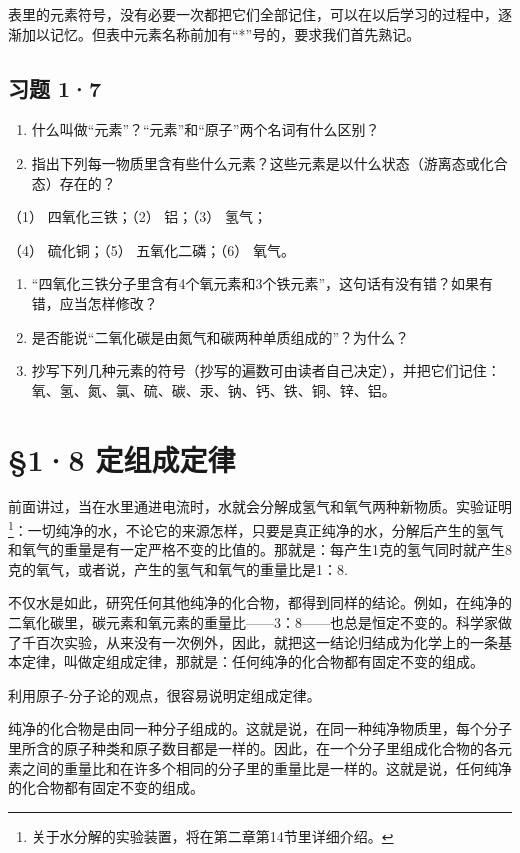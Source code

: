 表里的元素符号，没有必要一次都把它们全部记住，可以在以后学习的过程中，逐渐加以记忆。但表中元素名称前加有``*''号的，要求我们首先熟记。

\subsection{习题 1·7}

\begin{enumerate}
\item
  什么叫做``元素''？``元素''和``原子''两个名词有什么区别？
\item
  指出下列每一物质里含有些什么元素？这些元素是以什么状态（游离态或化合态）存在的？
\end{enumerate}

（1） 四氧化三铁；（2） 铝；（3） 氢气；

（4） 硫化铜；（5） 五氧化二磷；（6） 氧气。

\begin{enumerate}[start=3]
\item
  ``四氧化三铁分子里含有4个氧元素和3个铁元素''，这句话有没有错？如果有错，应当怎样修改？
\item
  是否能说``二氧化碳是由氮气和碳两种单质组成的''？为什么？
\item
  抄写下列几种元素的符号（抄写的遍数可由读者自己决定），并把它们记住：氧、氢、氮、氯、硫、碳、汞、钠、钙、铁、铜、锌、铝。
\end{enumerate}

\section{§1·8 定组成定律}

前面讲过，当在水里通进电流时，水就会分解成氢气和氧气两种新物质。实验证明\footnote{关于水分解的实验装置，将在第二章第14节里详细介绍。}：一切纯净的水，不论它的来源怎样，只要是真正纯净的水，分解后产生的氢气和氧气的重量是有一定严格不变的比值的。那就是：每产生1克的氢气同时就产生8克的氧气，或者说，产生的氢气和氧气的重量比是1：8.

不仅水是如此，研究任何其他纯净的化合物，都得到同样的结论。例如，在纯净的二氧化碳里，碳元素和氧元素的重量比------3：8------也总是恒定不变的。科学家做了千百次实验，从来没有一次例外，因此，就把这一结论归结成为化学上的一条基本定律，叫做定组成定律，那就是：任何纯净的化合物都有固定不变的组成。

利用原子-分子论的观点，很容易说明定组成定律。

纯净的化合物是由同一种分子组成的。这就是说，在同一种纯净物质里，每个分子里所含的原子种类和原子数目都是一样的。因此，在一个分子里组成化合物的各元素之间的重量比和在许多个相同的分子里的重量比是一样的。这就是说，任何纯净的化合物都有固定不变的组成。

